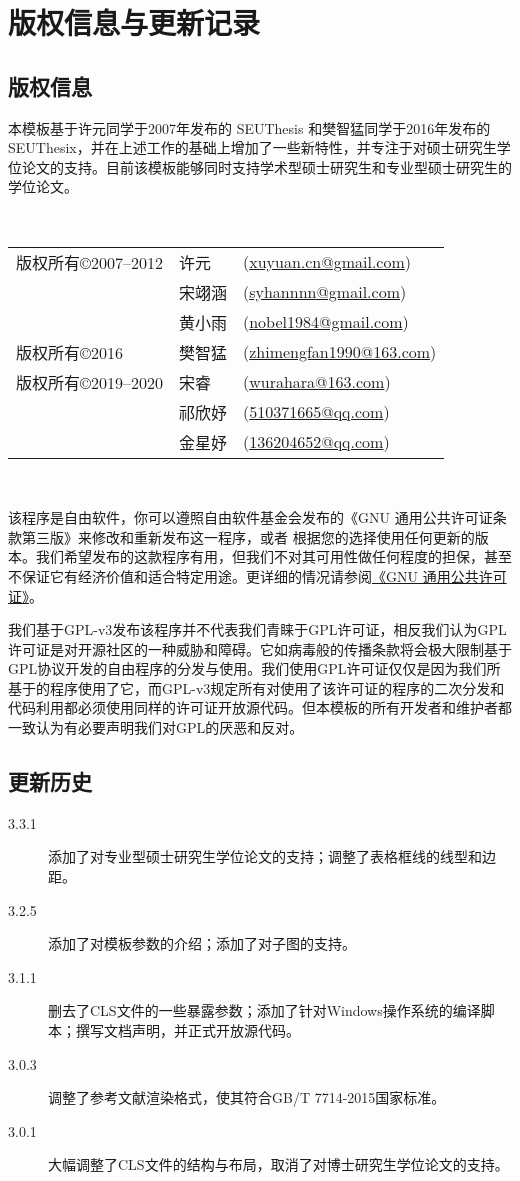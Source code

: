 \chapter{版权信息与更新记录}
\label{chp:version_license}

\section{版权信息}

本模板基于许元同学于2007年发布的 SEUThesis 和樊智猛同学于2016年发布的 SEUThesix，并在上述工作的基础上增加了一些新特性，并专注于对硕士研究生学位论文的支持。目前该模板能够同时支持学术型硕士研究生和专业型硕士研究生的学位论文。

~

\begin{tabular}{lll}
版权所有\copyright 2007--2012    & 许元      &(\url{xuyuan.cn@gmail.com})\\
                                & 宋翊涵    &(\url{syhannnn@gmail.com})\\
                                & 黄小雨   & (\url{nobel1984@gmail.com})\\
版权所有\copyright 2016          & 樊智猛   &(\url{zhimengfan1990@163.com})\\
版权所有\copyright 2019--2020    & 宋睿       &(\url{wurahara@163.com})\\
                                & 祁欣妤     &(\url{510371665@qq.com})\\
                                & 金星妤    &(\url{136204652@qq.com})\\
\end{tabular}

~

该程序是自由软件，你可以遵照自由软件基金会发布的《GNU 通用公共许可证条款第三版》来修改和重新发布这一程序，或者 根据您的选择使用任何更新的版本。我们希望发布的这款程序有用，但我们不对其可用性做任何程度的担保，甚至不保证它有经济价值和适合特定用途。更详细的情况请参阅\href{http://www.gnu.org/licenses/gpl.html}{《GNU 通用公共许可证》}。

我们基于GPL-v3发布该程序并不代表我们青睐于GPL许可证，相反我们认为GPL许可证是对开源社区的一种威胁和障碍。它如病毒般的传播条款将会极大限制基于GPL协议开发的自由程序的分发与使用。我们使用GPL许可证仅仅是因为我们所基于的程序使用了它，而GPL-v3规定所有对使用了该许可证的程序的二次分发和代码利用都必须使用同样的许可证开放源代码。但本模板的所有开发者和维护者都一致认为有必要声明我们对GPL的厌恶和反对。

\section{更新历史}

\begin{description}
  \item[3.3.1] 添加了对专业型硕士研究生学位论文的支持；调整了表格框线的线型和边距。
  \item[3.2.5] 添加了对模板参数的介绍；添加了对子图的支持。
  \item[3.1.1] 删去了CLS文件的一些暴露参数；添加了针对Windows操作系统的编译脚本；撰写文档声明，并正式开放源代码。
  \item[3.0.3] 调整了参考文献渲染格式，使其符合GB/T 7714-2015国家标准。
  \item[3.0.1] 大幅调整了CLS文件的结构与布局，取消了对博士研究生学位论文的支持。
\end{description}
